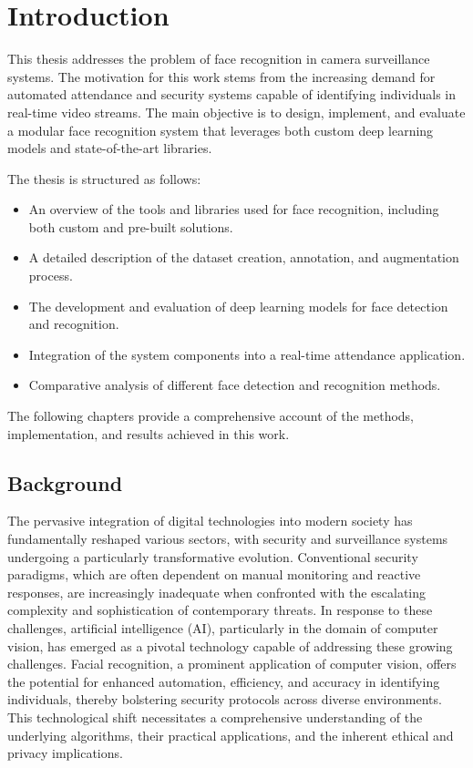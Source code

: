 \setcounter{page}{1}
\setcounter{equation}{0}
\setcounter{figure}{0}
\setcounter{table}{0}

\section*{Introduction}
This thesis addresses the problem of face recognition in camera surveillance systems. The motivation for this work stems from the increasing demand for automated attendance and security systems capable of identifying individuals in real-time video streams. The main objective is to design, implement, and evaluate a modular face recognition system that leverages both custom deep learning models and state-of-the-art libraries.

The thesis is structured as follows:
\begin{itemize}
    \item An overview of the tools and libraries used for face recognition, including both custom and pre-built solutions.
    \item A detailed description of the dataset creation, annotation, and augmentation process.
    \item The development and evaluation of deep learning models for face detection and recognition.
    \item Integration of the system components into a real-time attendance application.
    \item Comparative analysis of different face detection and recognition methods.
\end{itemize}

The following chapters provide a comprehensive account of the methods, implementation, and results achieved in this work.

\subsection*{Background}
The pervasive integration of digital technologies into modern society has fundamentally reshaped various sectors, with security and surveillance systems undergoing a particularly transformative evolution. Conventional security paradigms, which are often dependent on manual monitoring and reactive responses, are increasingly inadequate when confronted with the escalating complexity and sophistication of contemporary threats. In response to these challenges, artificial intelligence (AI), particularly in the domain of computer vision, has emerged as a pivotal technology capable of addressing these growing challenges. Facial recognition, a prominent application of computer vision, offers the potential for enhanced automation, efficiency, and accuracy in identifying individuals, thereby bolstering security protocols across diverse environments. This technological shift necessitates a comprehensive understanding of the underlying algorithms, their practical applications, and the inherent ethical and privacy implications.

